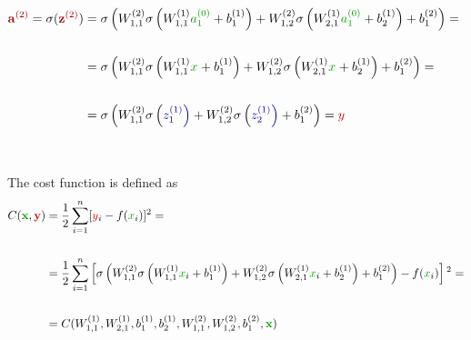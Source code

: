 \documentclass[pdflatex]{article}
\begin{document}
\def\agr#1{{\color{mygreen}a_{#1}^{(0)}}}
\def\ag#1{{\color{mygreen}x_{#1}}}
 {$\begin{aligned} %
       {\color{mydarkred}\mathbf{a}^{(2)}} =
       \sigma({\color{mydarkred}\mathbf{z}^{(2)}}) 
       &= \color{black}\sigma\left( \color{black}
             W^{(2)}_{1,1}\color{black}\sigma\left( \color{black}
             W^{(1)}_{1,1}\agr{1} + b_1^{(1)}\right) + W^{(2)}_{1,2}\sigma\left( \color{black}
             W^{(1)}_{2,1}\agr{1} + b_2^{(1)}
             \right) + b_1^{(2)}
             \color{black}\right) = \\
           \\
        &= \color{black}\sigma\left( \color{black}
             W^{(2)}_{1,1}\color{black}\sigma\left( \color{black}
             W^{(1)}_{1,1}\ag{} + b_1^{(1)}\right) + W^{(2)}_{1,2}\sigma\left( \color{black}
             W^{(1)}_{2,1}\ag{} + b_2^{(1)}
             \right) + b_1^{(2)}
             \color{black}\right) = \\
           \\
           & = \color{black}\sigma\left( \color{black}
             W^{(2)}_{1,1}\color{black}\sigma\left( \color{mydarkblue}
             z^{(1)}_{1}\right) + W^{(2)}_{1,2}\sigma\left(\color{mydarkblue}
             z^{(1)}_{2}
             \right) + b_1^{(2)}
             \color{black}\right) =  \color{myred} y\\
           \\
      \end{aligned}$} 


    \[
      \]

      The cost function is defined as
      \def\yr{{\color{myred}y}}
      \def\xg{{\color{mygreen}x}}
      \def\zr{{\color{myred}z}}
      \def\zb{{\color{myblue}z}}
      \begin{align}
        C(\mathbf{\xg},\mathbf{\yr)} & = \frac{1}{2} \sum_{i=1}^{n} [ \yr_i-f({\xg_i})]^2  =
        \\
        \\
        & =   \frac{1}{2} \sum_{i=1}^{n} \left[
           \color{black}\sigma\left( \color{black}
             W^{(2)}_{1,1}\color{black}\sigma\left( \color{black}
             W^{(1)}_{1,1}\xg_i + b_1^{(1)}\right) + W^{(2)}_{1,2}\sigma\left( \color{black}
             W^{(1)}_{2,1}\xg_i + b_2^{(1)}
             \right) + b_1^{(2)} 
             \color{black}\right) - f(\xg_i) 
          \right]^2 =\\
        \\
          & = 
          C(W^{(1)}_{1,1}, W^{(1)}_{2,1}, b^{(1)}_1,b^{(1)}_2,
            W^{(2)}_{1,1},W^{(2)}_{1,2},b^{(2)}_1,\mathbf{\xg}) 
          \end{align}
\end{document}
